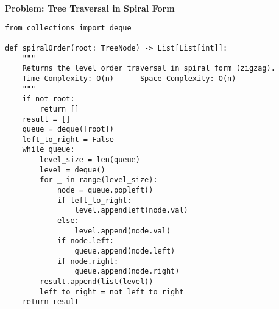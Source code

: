 \noindent\textbf{Problem: Tree Traversal in Spiral Form}
\begin{verbatim}
from collections import deque

def spiralOrder(root: TreeNode) -> List[List[int]]:
    """
    Returns the level order traversal in spiral form (zigzag).
    Time Complexity: O(n)      Space Complexity: O(n)
    """
    if not root:
        return []
    result = []
    queue = deque([root])
    left_to_right = False
    while queue:
        level_size = len(queue)
        level = deque()
        for _ in range(level_size):
            node = queue.popleft()
            if left_to_right:
                level.appendleft(node.val)
            else:
                level.append(node.val)
            if node.left:
                queue.append(node.left)
            if node.right:
                queue.append(node.right)
        result.append(list(level))
        left_to_right = not left_to_right
    return result
\end{verbatim}

